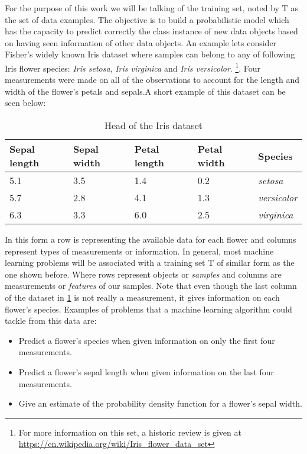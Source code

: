 For the purpose of this work we will be talking of the training set, noted by $\mathrm{T}$ as the set of data examples. The objective is to build a probabilistic model which has the capacity to predict correctly the class instance of new data objects based on having seen information of other data objects. An example lets consider Fisher's widely known Iris dataset where samples can belong to any of following Iris flower species: \textit{Iris setosa}, \textit{Iris virginica} and \textit{Iris versicolor}. 
\footnote{For more information on this set, a historic review is given at \url{https://en.wikipedia.org/wiki/Iris_flower_data_set}}.
Four measurements were made on all of the observations to account for the length and width of the flower's petals and sepals.A short example of this dataset can be seen below:

\begin{table}[ht]
\caption{Head of the Iris dataset}
\label{tab:iris_dataset}
\centering
\begin{tabular}{ l l l l l }
\toprule
Sepal length & Sepal width & Petal length & Petal width & Species \\
\midrule
5.1  & 3.5 &  1.4 & 0.2 & \textit{setosa}\\
5.7  & 2.8 &  4.1 & 1.3 & \textit{versicolor} \\
6.3  & 3.3 &  6.0 & 2.5 & \textit{virginica} \\
\bottomrule
\end{tabular}
\end{table}

In this form a row is representing the available data for each flower and columns represent types of measurements or information. In general, most machine learning problems will be associated with a training set  $\mathrm{T}$ of similar form as the one shown before. Where rows represent objects or \textit{samples} and columns are measurements or \textit{features} of our samples. Note that even though the last column of the dataset in \ref{tab:iris_dataset} is not really a measurement, it gives information on each flower's species. Examples of problems that a machine learning algorithm could tackle from this data are: 

\begin{itemize}
	\item Predict a flower's species when given information on only the first four measurements.
	\item Predict a flower's sepal length when given information on the last four measurements.
	\item Give an estimate of the probability density function for a flower's sepal width.
\end{itemize}

